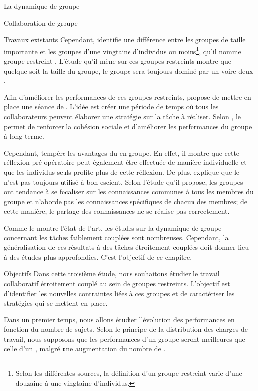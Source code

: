 \documentclass[myfrancais,ngerman,english,french]{mythesis}
\begin{document}
\begin{mychapter}{La dynamique de groupe}
\begin{mysection}{Collaboration de groupe}
\begin{mysubsection}{Travaux existants}
				Cependant,  identifie une différence entre les groupes de taille importante et les groupes d'une vingtaine d'individus ou moins\footnote{Selon les différentes sources, la définition d'un groupe restreint varie d'une douzaine à une vingtaine d'individus.}, qu'il nomme \og groupe restreint \fg.
				L'étude qu'il mène sur ces groupes restreints montre que quelque soit la taille du groupe, le groupe sera toujours dominé par un voire deux .

				Afin d'améliorer les performances de ces groupes restreints,  propose de mettre en place une séance de \mybrainstorming.
				L'idée est créer une période de temps où tous les collaborateurs peuvent élaborer une stratégie sur la tâche à réaliser.
				Selon , le \mybrainstorming permet de renforcer la cohésion sociale et d'améliorer les performances du groupe à long terme.

				Cependant,  tempère les avantages du \mybrainstorming en groupe.
				En effet, il montre que cette réflexion pré-opératoire peut également être effectuée de manière individuelle et que les individus seuls profite plus de cette réflexion.
				De plus,  explique que le \mybrainstorming n'est pas toujours utilisé à bon escient.
				Selon l'étude qu'il propose, les groupes ont tendance à se focaliser sur les connaissances communes à tous les membres du groupe et n'aborde pas les connaissances spécifiques de chacun des membres; de cette manière, le partage des connaissances ne se réalise pas correctement.

				Comme le montre l'état de l'art, les études sur la dynamique de groupe concernant les tâches faiblement couplées sont nombreuses.
				Cependant, la généralisation de ces résultats à des tâches étroitement couplées doit donner lieu à des études plus approfondies.
				C'est l'objectif de ce chapitre.
			\end{mysubsection}
			\begin{mysubsection}{Objectifs}
				Dans cette troisième étude, nous souhaitons étudier le travail collaboratif étroitement couplé au sein de groupes restreints.
				L'objectif est d'identifier les nouvelles contraintes liées à ces groupes et de caractériser les stratégies qui se mettent en place.

				Dans un premier temps, nous allons étudier l'évolution des performances en fonction du nombre de sujets.
				Selon le principe de la distribution des charges de travail, nous supposons que les performances d'un groupe seront meilleures que celle d'un , malgré une augmentation du nombre de .


\end{mysubsection}
\end{mysection}
\end{mychapter}
\end{document}

